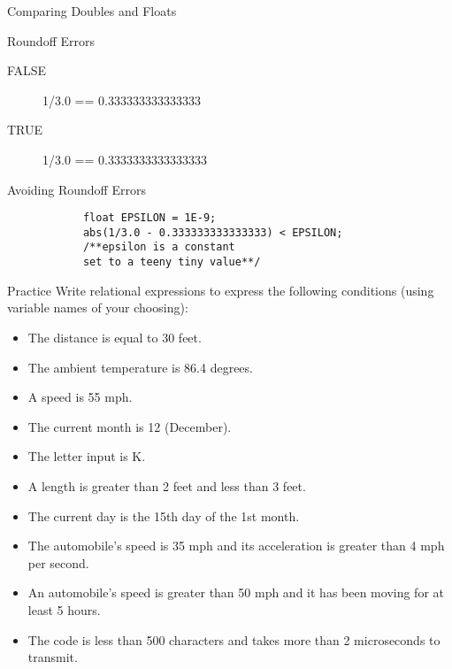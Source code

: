 \documentclass[xcolor={dvipsnames}]{beamer}
\begin{document}
\begin{frame}[fragile]{Comparing Doubles and Floats}
\Large	
\begin{block}{Roundoff Errors}
		\begin{description}
			\item[FALSE] 1/3.0 == 0.333333333333333
			\item[TRUE] 1/3.0 == 0.3333333333333333
		\end{description}
	\end{block}
	\pause
	\begin{block}{Avoiding Roundoff Errors}
		\begin{verbatim}
			float EPSILON = 1E-9;
			abs(1/3.0 - 0.333333333333333) < EPSILON;
			/**epsilon is a constant 
			set to a teeny tiny value**/
		\end{verbatim}
	\end{block}
\end{frame}

\begin{frame}{Practice}
Write relational expressions to express the following conditions (using variable names of your choosing):
	\begin{itemize}
		\item The distance is equal to 30 feet.	
		\item The ambient temperature is 86.4 degrees.
		\item A speed is 55 mph.
		\item The current month is 12 (December).
		\item The letter input is K.
		\item A length is greater than 2 feet and less than 3 feet.
		\item The current day is the 15th day of the 1st month.
		\item The automobile's speed is 35 mph and its acceleration is greater than 4 mph per second.
		\item An automobile's speed is greater than 50 mph and it has been moving for at least 5 hours.
		\item The code is less than 500 characters and takes more than 2 microseconds to transmit.
	\end{itemize}
\end{frame}
\end{document}
